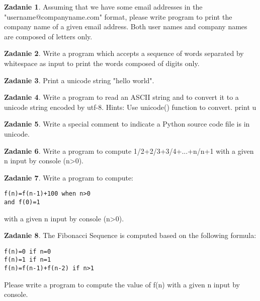 \documentclass[11pt]{article}
\theoremstyle{definition}
\newtheorem{zadanie}{Zadanie}
\begin{document}
\begin{zadanie}
Assuming that we have some email addresses in the "username@companyname.com" format, please write program to print the company name of a given email address. Both user names and company names are composed of letters only.

\end{zadanie}

\begin{zadanie}
Write a program which accepts a sequence of words separated by whitespace as input to print the words composed of digits only.

\end{zadanie}

\begin{zadanie}
Print a unicode string "hello world".

\end{zadanie}

\begin{zadanie}
Write a program to read an ASCII string and to convert it to a unicode string encoded by utf-8.
Hints:
Use unicode() function to convert.
print u

\end{zadanie}

\begin{zadanie}
Write a special comment to indicate a Python source code file is in unicode.

\end{zadanie}

\begin{zadanie}
Write a program to compute 1/2+2/3+3/4+...+n/n+1 with a given n input by console (n>0).

\end{zadanie}

\begin{zadanie}
Write a program to compute:
\begin{verbatim}
f(n)=f(n-1)+100 when n>0
and f(0)=1
\end{verbatim}
with a given n input by console (n>0).

\end{zadanie}

\begin{zadanie}
The Fibonacci Sequence is computed based on the following formula:
\begin{verbatim}
f(n)=0 if n=0
f(n)=1 if n=1
f(n)=f(n-1)+f(n-2) if n>1
\end{verbatim}
Please write a program to compute the value of f(n) with a given n input by console.

\end{zadanie}
\end{document}
